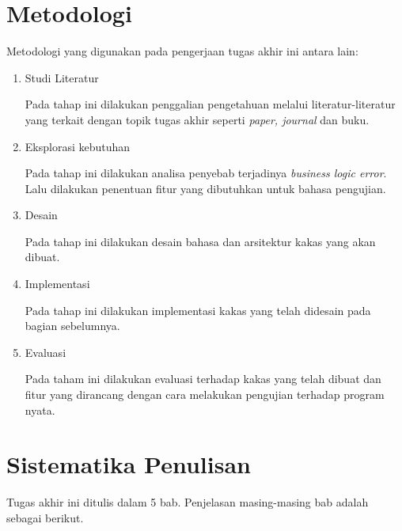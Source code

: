 \section{Metodologi}

Metodologi yang digunakan pada pengerjaan tugas akhir ini antara lain:

\begin{enumerate}
    \item Studi Literatur

          Pada tahap ini dilakukan penggalian pengetahuan melalui literatur-literatur yang terkait
          dengan topik tugas akhir seperti \textit{paper, journal} dan buku.

    \item Eksplorasi kebutuhan

          Pada tahap ini dilakukan analisa penyebab terjadinya \emph{business logic error}.
          Lalu dilakukan penentuan fitur yang dibutuhkan untuk bahasa pengujian.

    \item Desain

          Pada tahap ini dilakukan desain bahasa dan arsitektur kakas yang akan dibuat.

    \item Implementasi

          Pada tahap ini dilakukan implementasi kakas yang telah didesain pada bagian sebelumnya.

    \item Evaluasi

          Pada taham ini dilakukan evaluasi terhadap kakas yang telah dibuat dan fitur yang dirancang
          dengan cara melakukan pengujian terhadap program nyata.
\end{enumerate}


\section{Sistematika Penulisan}

Tugas akhir ini ditulis dalam 5 bab. Penjelasan masing-masing bab adalah sebagai berikut.

